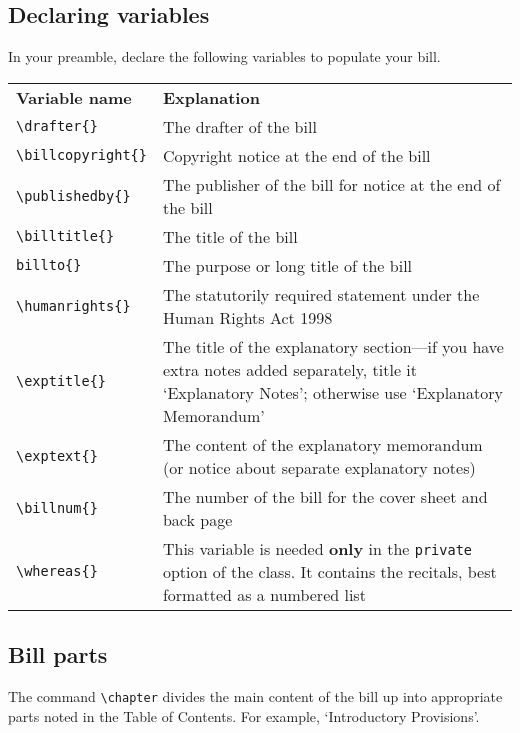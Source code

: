 \documentclass{article}
\begin{document}
\subsection{Declaring variables}
In your preamble, declare  the following variables to populate your bill. 
\begin{center}
\begin{tabular}{lp{2.5in}}
\bfseries Variable name & \bfseries Explanation\\
\ttfamily \verb|\drafter{}| & The drafter of the bill\\
\ttfamily \verb|\billcopyright{}| & Copyright notice at the end of the bill \\
\ttfamily \verb|\publishedby{}| & The publisher of the bill for notice at the end of the bill \\
\ttfamily\verb|\billtitle{}| & The title of the bill\\
\ttfamily \verb|billto{}| & { The purpose or long title of the bill}\\
\ttfamily \verb|\humanrights{}| & The statutorily required statement under the Human Rights Act 1998\\
\ttfamily \verb|\exptitle{}| & The title of the explanatory section—if you have extra notes added separately, title it `Explanatory Notes'; otherwise use `Explanatory Memorandum'\\
\ttfamily \verb|\exptext{}| & The content of the explanatory memorandum (or notice about separate explanatory notes)\\
\ttfamily \verb|\billnum{}| & The number of the bill for the cover sheet and back page\\
\ttfamily \verb|\whereas{}| &
This variable is needed \textbf{only} in the \texttt{private} option of the class. It contains  the recitals, best formatted as a numbered list 
\end{tabular}

\end{center}


\subsection{Bill parts}
The command {\color{darkspringgreen}\ttfamily\verb|\chapter|} divides the  main content of the bill up into appropriate parts noted in the Table of Contents. For example, `Introductory Provisions'.  
\end{document}
